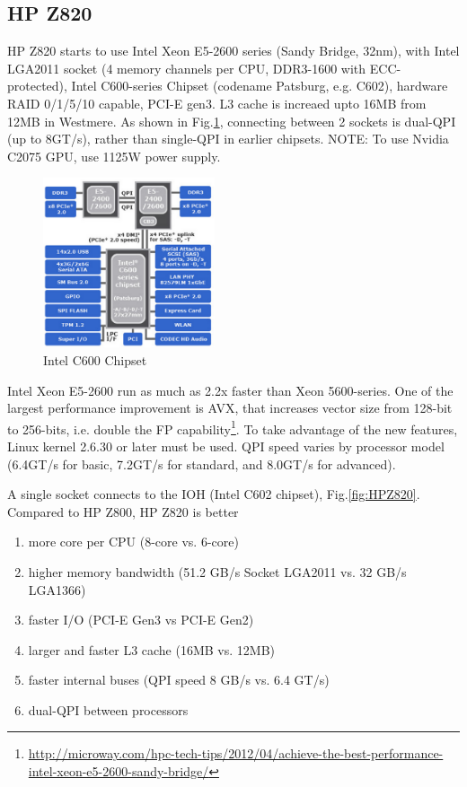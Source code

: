 \subsection{HP Z820}
\label{sec:HP_Z820}

HP Z820 starts to use Intel Xeon E5-2600 series (Sandy Bridge, 32nm), with Intel
LGA2011 socket (4 memory channels per CPU, DDR3-1600 with ECC-protected), Intel
C600-series Chipset (codename Patsburg, e.g.
C602), hardware RAID 0/1/5/10 capable, PCI-E gen3. L3 cache is increaed upto
16MB from 12MB in Westmere. As shown in Fig.\ref{fig:IntelC600chipset},
connecting between 2 sockets is dual-QPI (up to 8GT/s), rather than single-QPI
in earlier chipsets. NOTE: To use Nvidia C2075 GPU, use 1125W power supply.

\begin{figure}[hbt]
  \centerline{\includegraphics[height=5cm,
    angle=0]{./images/IntelC600chipset.eps}}
\caption{Intel C600 Chipset}
\label{fig:IntelC600chipset}
\end{figure}

Intel Xeon E5-2600 run as much as 2.2x faster than Xeon 5600-series. One of the
largest performance improvement is AVX, that increases vector size from 128-bit
to 256-bits, i.e. double the FP
capability\footnote{\url{http://microway.com/hpc-tech-tips/2012/04/achieve-the-best-performance-intel-xeon-e5-2600-sandy-bridge/}}.
To take advantage of the new features, Linux kernel 2.6.30 or later must be
used. QPI speed varies by processor model (6.4GT/s for basic, 7.2GT/s for
standard, and 8.0GT/s for advanced).

A single socket connects to the IOH (Intel C602 chipset), Fig.\ref{fig:HPZ820}.
Compared to HP Z800, HP Z820 is better
\begin{enumerate}
  \item more core per CPU (8-core vs. 6-core)
  \item higher memory bandwidth (51.2 GB/s Socket LGA2011 vs. 32 GB/s LGA1366)
  \item faster I/O (PCI-E Gen3 vs PCI-E Gen2)
  \item larger and faster L3 cache (16MB vs. 12MB)
  \item faster internal buses (QPI speed 8 GB/s vs. 6.4 GT/s)
  \item dual-QPI between processors
\end{enumerate}

